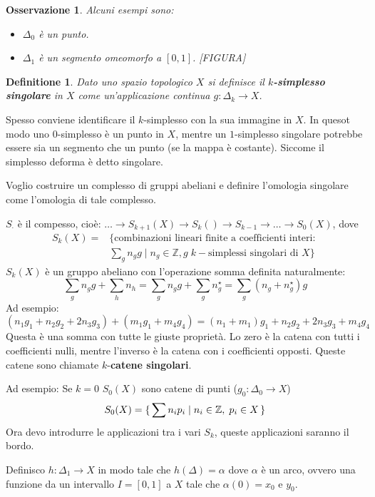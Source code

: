 \documentclass{article}
\newtheorem{osservation}[theorem]{Osservazione}
\newtheorem{definition}[theorem]{Definitione}
\newcommand{\Z}{\mathbb{Z}}
\begin{document}
\begin{osservation} Alcuni esempi sono:
  \begin{itemize}
  \item $ \Delta_0 $ è un punto.
  \item $ \Delta_1 $ è un segmento omeomorfo a $ [0,1] $.
    [FIGURA]
  \end{itemize}
\end{osservation}

\begin{definition}
  Dato uno spazio topologico $ X $ si definisce il \textbf{$ k $-simplesso singolare}
  in $ X $ come un'applicazione continua $ g: \Delta_k \to X $.
\end{definition}
Spesso conviene identificare il $ k $-simplesso con la sua immagine in $ X $.
In quesot modo uno $ 0 $-simplesso è un punto in $ X $, mentre un $ 1 $-simplesso singolare potrebbe essere sia un segmento che un punto (se la mappa è costante). Siccome
il simplesso deforma è detto singolare.

Voglio costruire un complesso di gruppi abeliani e definire l'omologia singolare come l'omologia di tale complesso.

$ S_\cdot $ è il compesso, cioè: $ \dots \to S_{k+1}(X) \to S_k() \to S_{k-1} \to \dots \to S_0(X) $, dove
\begin{align*}
  S_k(X) ={}& \{\text{combinazioni lineari finite a coefficienti interi: } \\
         & \sum_g n_g g \;|\; n_g \in \Z, g \; k-\text{simplessi singolari di } X \}
\end{align*}
$ S_k(X) $ è un gruppo abeliano con l'operazione somma definita naturalmente:
\[
  \sum_g n_g g + \sum_h n_h =   \sum_g n_g g + \sum_g n_g^\star = \sum_g (n_g + n_g^\star)g
\]
Ad esempio:
\[
  (n_1 g_1 + n_2 g_2 + 2 n_3 g_3) + (m_1 g_1 + m_4 g_4) = (n_1 + m_1)g_1 + n_2 g_2 + 2 n_3 g_3 + m_4 g_4
\]
Questa è una somma con tutte le giuste proprietà. Lo zero è la catena con tutti i coefficienti nulli,
mentre l'inverso è la catena con i coefficienti opposti.
Queste catene sono chiamate $ k $-\textbf{catene singolari}.

Ad esempio:
Se $ k = 0 $ $ S_0(X) $ sono catene di punti ($ g_0 : \Delta_0 \to X $)
\[
  S_0(X) = \set { \sum n_i p_i | n_i \in \Z, \; p_i \in X}
\]
Ora devo introdurre le applicazioni tra i vari $ S_k $, queste applicazioni saranno il bordo.

Definisco $ h: \Delta_1 \to X $ in modo tale che $ h(\Delta) = \alpha $ dove $ \alpha $ è un arco, ovvero una funzione
da un intervallo $ I = [0,1] $ a $ X $ tale che $ \alpha(0) = x_0 $ e $ y_0 $.
\end{document}
